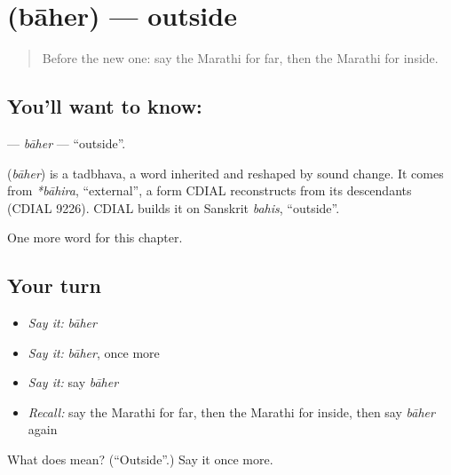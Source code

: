 \section[\texorpdfstring{\mr{बाहेर} (bāher)}{बाहेर (bāher)}]{ (bāher) — outside}

\label{lesson:MR-C112-baher}



\begin{quote}
Before the new one: say the Marathi for far, then the Marathi for inside.
\end{quote}

\subsection*{You'll want to know: }
\textbf{} — \emph{bāher} — \textquotedblleft{}outside\textquotedblright{}.

\begin{cousinweb}
\textbf{} (\emph{bāher}) is a tadbhava, a word inherited and reshaped by sound change. It comes from \emph{*bāhira}, \textquotedblleft{}external\textquotedblright{}, a form CDIAL reconstructs from its descendants (CDIAL 9226). CDIAL builds it on Sanskrit \emph{bahis}, \textquotedblleft{}outside\textquotedblright{}.
\end{cousinweb}

\begin{grammarlens}[title={What you've built}]
One more word for this chapter.
\end{grammarlens}

\subsection*{Your turn}
\begin{itemize}
\raggedright
  \item \emph{Say it:} \emph{bāher}
  \item \emph{Say it:} \emph{bāher}, once more
  \item \emph{Say it:} say \emph{bāher}
  \item \emph{Recall:} say the Marathi for far, then the Marathi for inside, then say \emph{bāher} again
\end{itemize}

\begin{tcolorbox}[breakable,colback=teal!4,colframe=teal!35!black,title={Before you move on}]
What does  mean? (\textquotedblleft{}Outside\textquotedblright{}.) Say it once more.
\end{tcolorbox}
